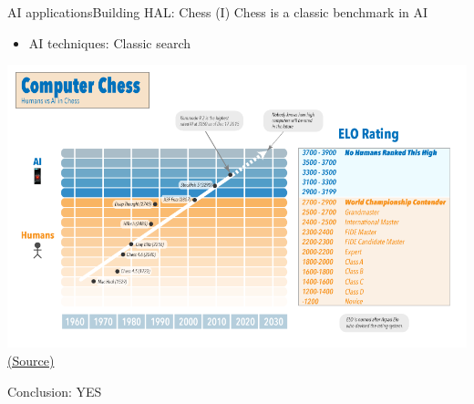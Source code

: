 \documentclass[10pt,compress]{beamer} %
\begin{document}
\begin{frame}{AI applications}{Building HAL: Chess (I)}
	Chess is a classic benchmark in AI
	\begin{itemize}
		\item AI techniques: Classic search
	\end{itemize}

	\vspace{-0.4cm}

	\begin{center}
		\includegraphics[width=0.7\linewidth]{figs/elo.png}\\
		\tiny{\href{http://www.statisticsviews.com/details/feature/8791241/Artificial-Intelligence-Solving-the-Chinese-Room-Argument.html}{(Source)}}
	\end{center}

	\vspace{-0.6cm}

	Conclusion: YES
\end{frame}
\end{document}
